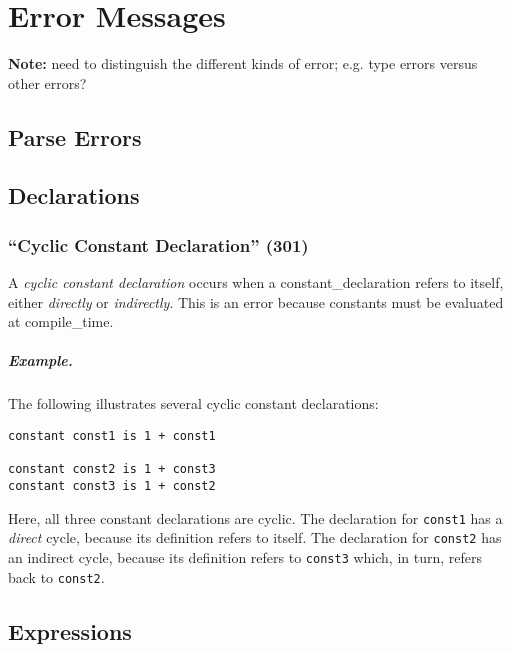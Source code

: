 \chapter{Error Messages}

{\bf Note:} need to distinguish the different kinds of error; e.g. type errors versus other errors?

\section{Parse Errors}

\section{Declarations}

\subsection{``Cyclic Constant Declaration'' (301)}

A {\em cyclic constant declaration} occurs when a \gls{constant_declaration} refers to itself, either {\em directly} or {\em indirectly}.  This is an error because constants must be evaluated at \gls{compile_time}.

\paragraph{Example.}  The following illustrates several cyclic constant declarations:

\begin{lstlisting}
constant const1 is 1 + const1

constant const2 is 1 + const3
constant const3 is 1 + const2
\end{lstlisting}
Here, all three constant declarations are cyclic.  The declaration for \lstinline{const1} has a {\em direct} cycle, because its definition refers to itself.  The declaration for \lstinline{const2} has an indirect cycle, because its definition refers to \lstinline{const3} which, in turn, refers back to \lstinline{const2}.

\section{Expressions}


